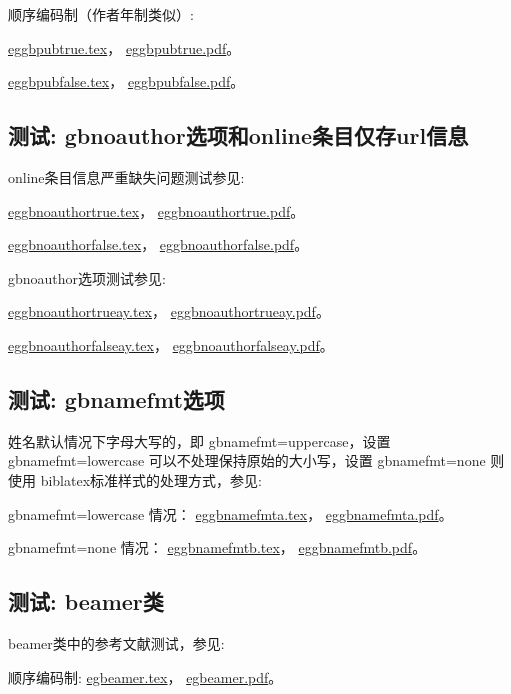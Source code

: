 顺序编码制（作者年制类似）:

\href{run:./example/eggbpubtrue.tex}{eggbpubtrue.tex}，
\href{run:./example/eggbpubtrue.pdf}{eggbpubtrue.pdf}。

\href{run:./example/eggbpubfalse.tex}{eggbpubfalse.tex}，
\href{run:./example/eggbpubfalse.pdf}{eggbpubfalse.pdf}。


\subsection{测试: gbnoauthor选项和online条目仅存url信息}
\label{sec:opt:noauthor}
online条目信息严重缺失问题测试参见:

\href{run:./example/eggbnoauthortrue.tex}{eggbnoauthortrue.tex}，
\href{run:./example/eggbnoauthortrue.pdf}{eggbnoauthortrue.pdf}。

\href{run:./example/eggbnoauthorfalse.tex}{eggbnoauthorfalse.tex}，
\href{run:./example/eggbnoauthorfalse.pdf}{eggbnoauthorfalse.pdf}。

gbnoauthor选项测试参见:

\href{run:./example/eggbnoauthortrueay.tex}{eggbnoauthortrueay.tex}，
\href{run:./example/eggbnoauthortrueay.pdf}{eggbnoauthortrueay.pdf}。

\href{run:./example/eggbnoauthorfalseay.tex}{eggbnoauthorfalseay.tex}，
\href{run:./example/eggbnoauthorfalseay.pdf}{eggbnoauthorfalseay.pdf}。

\subsection{测试: gbnamefmt选项}
\label{sec:opt:namefmt}
姓名默认情况下字母大写的，即 gbnamefmt=uppercase，设置 gbnamefmt=lowercase 可以不处理保持原始的大小写，设置 gbnamefmt=none 则使用 biblatex标准样式的处理方式，参见:

gbnamefmt=lowercase 情况：
\href{run:./example/eggbnamefmta.tex}{eggbnamefmta.tex}，
\href{run:./example/eggbnamefmta.pdf}{eggbnamefmta.pdf}。

gbnamefmt=none 情况：
\href{run:./example/eggbnamefmtb.tex}{eggbnamefmtb.tex}，
\href{run:./example/eggbnamefmtb.pdf}{eggbnamefmtb.pdf}。

\subsection{测试: beamer类}

beamer类中的参考文献测试，参见:

顺序编码制:
\href{run:./example/egbeamer.tex}{egbeamer.tex}，
\href{run:./example/egbeamer.pdf}{egbeamer.pdf}。

